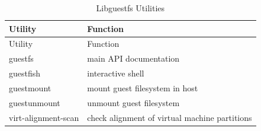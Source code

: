 \documentclass[
  14pt,
  english,
  a4paper,
]{scrreprt}
\begin{document}
\hypertarget{tbl:lgfs_tools}{}
\begin{longtable}[]{@{}ll@{}}
\caption{\label{tbl:lgfs_tools}Libguestfs Utilities}\tabularnewline
\toprule
\begin{minipage}[b]{0.33\columnwidth}\raggedright
Utility\strut
\end{minipage} & \begin{minipage}[b]{0.61\columnwidth}\raggedright
Function\strut
\end{minipage}\tabularnewline
\midrule
\endfirsthead
\toprule
\begin{minipage}[b]{0.33\columnwidth}\raggedright
Utility\strut
\end{minipage} & \begin{minipage}[b]{0.61\columnwidth}\raggedright
Function\strut
\end{minipage}\tabularnewline
\midrule
\endhead
\begin{minipage}[t]{0.33\columnwidth}\raggedright
guestfs\strut
\end{minipage} & \begin{minipage}[t]{0.61\columnwidth}\raggedright
main API documentation\strut
\end{minipage}\tabularnewline
\begin{minipage}[t]{0.33\columnwidth}\raggedright
guestfish\strut
\end{minipage} & \begin{minipage}[t]{0.61\columnwidth}\raggedright
interactive shell\strut
\end{minipage}\tabularnewline
\begin{minipage}[t]{0.33\columnwidth}\raggedright
guestmount\strut
\end{minipage} & \begin{minipage}[t]{0.61\columnwidth}\raggedright
mount guest filesystem in host\strut
\end{minipage}\tabularnewline
\begin{minipage}[t]{0.33\columnwidth}\raggedright
guestunmount\strut
\end{minipage} & \begin{minipage}[t]{0.61\columnwidth}\raggedright
unmount guest filesystem\strut
\end{minipage}\tabularnewline
\begin{minipage}[t]{0.33\columnwidth}\raggedright
virt-alignment-scan\strut
\end{minipage} & \begin{minipage}[t]{0.61\columnwidth}\raggedright
check alignment of virtual machine partitions\strut

\end{minipage}
\end{longtable}
\end{document}
